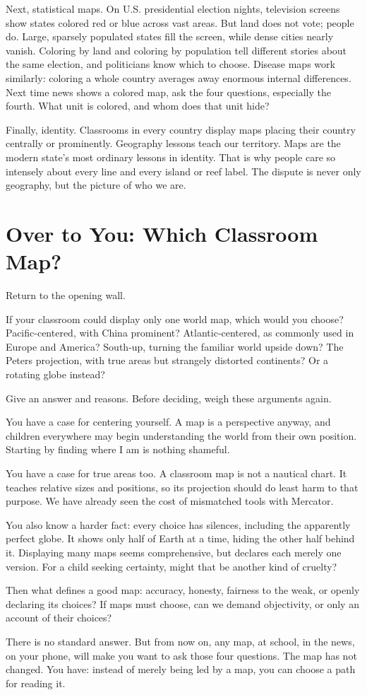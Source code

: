 Next, statistical maps. On U.S. presidential election nights, television screens show states colored red or blue across vast areas. But land does not vote; people do. Large, sparsely populated states fill the screen, while dense cities nearly vanish. Coloring by land and coloring by population tell different stories about the same election, and politicians know which to choose. Disease maps work similarly: coloring a whole country averages away enormous internal differences. Next time news shows a colored map, ask the four questions, especially the fourth. What unit is colored, and whom does that unit hide?

Finally, identity. Classrooms in every country display maps placing their country centrally or prominently. Geography lessons teach our territory. Maps are the modern state's most ordinary lessons in identity. That is why people care so intensely about every line and every island or reef label. The dispute is never only geography, but the picture of who we are.

\section{Over to You: Which Classroom Map?}
Return to the opening wall.

If your classroom could display only one world map, which would you choose? Pacific-centered, with China prominent? Atlantic-centered, as commonly used in Europe and America? South-up, turning the familiar world upside down? The Peters projection, with true areas but strangely distorted continents? Or a rotating globe instead?

Give an answer and reasons. Before deciding, weigh these arguments again.

You have a case for centering yourself. A map is a perspective anyway, and children everywhere may begin understanding the world from their own position. Starting by finding where I am is nothing shameful.

You have a case for true areas too. A classroom map is not a nautical chart. It teaches relative sizes and positions, so its projection should do least harm to that purpose. We have already seen the cost of mismatched tools with Mercator.

You also know a harder fact: every choice has silences, including the apparently perfect globe. It shows only half of Earth at a time, hiding the other half behind it. Displaying many maps seems comprehensive, but declares each merely one version. For a child seeking certainty, might that be another kind of cruelty?

Then what defines a good map: accuracy, honesty, fairness to the weak, or openly declaring its choices? If maps must choose, can we demand objectivity, or only an account of their choices?

There is no standard answer. But from now on, any map, at school, in the news, on your phone, will make you want to ask those four questions. The map has not changed. You have: instead of merely being led by a map, you can choose a path for reading it.

